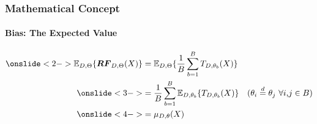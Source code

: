 \begin{frame}[c]
    \frametitle{Mathematical Concept}
    \framesubtitle{Bias: The Expected Value}
    \bigbreak
        \vspace{-5mm}
        \begin{align*}
            \onslide<2->\mathbb{E}_{D, \Theta}\{\boldsymbol{RF}_{D, \Theta}(X) \} 
            & = \mathbb{E}_{D, \Theta}\{\dfrac{1}{B}\sum_{b = 1}^{B}T_{D,\theta_{b}}(X)\}  \\
            \onslide<3->& = \dfrac{1}{B}\sum_{b=1}^{B}\mathbb{E}_{D,\theta_{b}}\{T_{D, \theta_{b}}(X)\} 
            & \text{($\theta_{i} \overset{d}{=}\theta_{j}$ $\forall i$,$j\in B$)}\\
            \onslide<4->& = \mu_{D,\theta}(X)
        \end{align*}
\end{frame}

